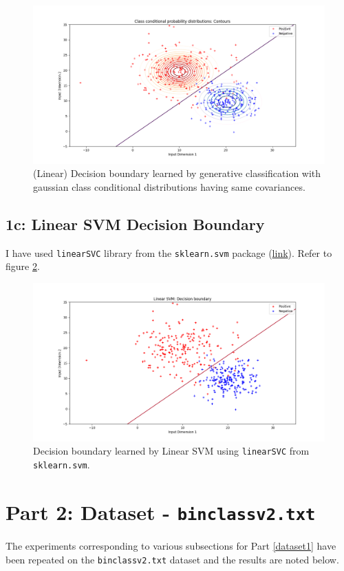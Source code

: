 \documentclass[a4paper,11pt]{article}
\begin{document}
\begin{mlsolution}
\begin{figure}[!htb]
	\centering
	\includegraphics[scale=0.4]{generative_same_covariance_binclass.png}
	\caption{(Linear) Decision boundary learned by generative classification with gaussian class conditional distributions having same covariances.}
	\label{gc1b}
\end{figure}

\subsection{1c: Linear SVM Decision Boundary}
I have used \texttt{linearSVC} library from the \texttt{sklearn.svm} package (\href{http://scikit-learn.org/stable/modules/generated/sklearn.svm.LinearSVC.html}{link}). Refer to figure \ref{svm1}.
\begin{figure}[!htb]
	\centering
	\includegraphics[scale=0.4]{linear_svm_binclass.png}
	\caption{Decision boundary learned by Linear SVM using \texttt{linearSVC} from \texttt{sklearn.svm}.}
	\label{svm1}
\end{figure}

\newpage
\section{Part 2: Dataset - \texttt{binclassv2.txt}}
The experiments corresponding to various subsections for Part \ref{dataset1} have been repeated on the \texttt{binclassv2.txt} dataset and the results are noted below.


\end{mlsolution}
\end{document}
